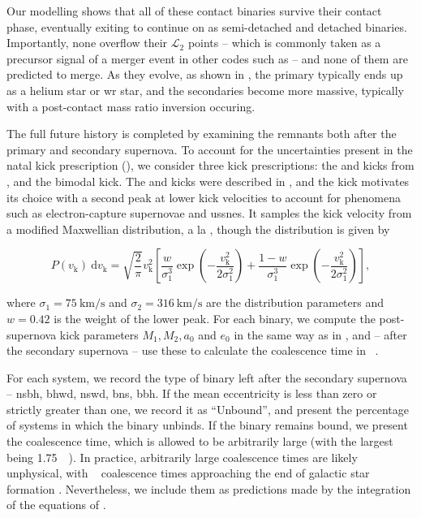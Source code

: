 Our modelling shows that all of these contact binaries survive their contact phase, eventually exiting to continue on as semi-detached and detached binaries. Importantly, none overflow their $\mathcal{L}_2$ points -- which is commonly taken as a precursor signal of a merger event in other codes such as  \citep{Fragos:2023} -- and none of them are predicted to merge. As they evolve, as shown in , the primary typically ends up as a helium star or \gls{wr} star, and the secondaries become more massive, typically with a post-contact mass ratio inversion occuring.

The full future history is completed by examining the remnants both after the primary and secondary supernova. To account for the uncertainties present in the natal kick prescription (), we consider three kick prescriptions: the \citet{Hobbs:2005} and \citet{Richards:2023} kicks from , and the bimodal \citet{Verbunt:2017} kick. The \citet{Hobbs:2005} and \citet{Richards:2023} kicks were described in , and the \citet{Verbunt:2017} kick motivates its choice with a second peak at lower kick velocities to account for phenomena such as electron-capture supernovae and \glspl{ussne}. It samples the kick velocity from a modified Maxwellian distribution, a la \citet{Hobbs:2005}, though the distribution is given by

\begin{equation}
    P(v_\text{k})~\mathrm{d}v_\text{k} = \sqrt{\frac{2}{\pi}} v_\text{k}^2\left[\frac{w}{\sigma_1^3}\exp\left(-\frac{v_\text{k}^2}{2\sigma_1^2}\right)+\frac{1-w}{\sigma_1^3}\exp\left(-\frac{v_\text{k}^2}{2\sigma_1^2}\right)\right],
\end{equation}

where $\sigma_1=\SI{75}{\km\per\s}$ and $\sigma_2=\SI{316}{\km\per\s}$ are the distribution parameters and $w=0.42$ is the weight of the lower peak. For each binary, we compute the post-supernova kick parameters $M_1, M_2, a_0$ and $e_0$ in the same way as in , and -- after the secondary supernova -- use these to calculate the coalescence time in \si{\giga\year}.

For each system, we record the type of binary left after the secondary supernova -- \gls{nsbh}, \gls{bhwd}, \gls{nswd}, \gls{bns}, \gls{bbh}. If the mean eccentricity is less than zero or strictly greater than one, we record it as ``Unbound'', and present the percentage of systems in which the binary unbinds. If the binary remains bound, we present the coalescence time, which is allowed to be arbitrarily large (with the largest being \SI{1.75}{\peta\year}). In practice, arbitrarily large coalescence times are likely unphysical, with \unit{\peta\year} coalescence times approaching the end of galactic star formation \citep{Adams:1997}. Nevertheless, we include them as predictions made by the integration of the equations of \citet{Peters:1964}.

